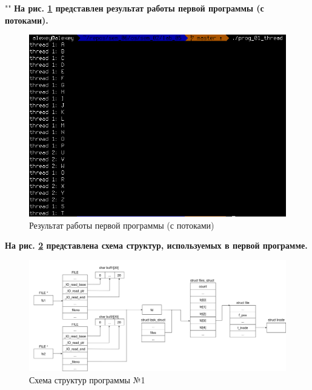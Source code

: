 \documentclass[12pt]{report}
\begin{document}
""\newline
\textbf{На рис. \ref{fig:prog_01_thread} представлен результат работы первой программы (с потоками).}

\begin{figure}[H]
	\centering
	\includegraphics[scale=0.6]{img/prog_01_thread.png}
	\caption{Результат работы первой программы (с потоками)}
	\label{fig:prog_01_thread}
\end{figure}


\textbf{На рис. \ref{fig:prog_01_schema} представлена схема структур, используемых в первой программе.}

\begin{figure}[H]
	\centering
	\includegraphics[scale=0.33]{img/prog_01_schema.jpg}
	\caption{Схема структур программы №1}
	\label{fig:prog_01_schema}
\end{figure}
\end{document}
